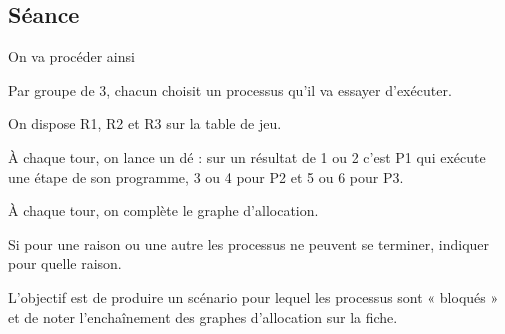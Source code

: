 \documentclass[12pt,a4paper,article,english,firamath]{nsi}
\begin{document}
\subsection*{Séance}

On va procéder ainsi

\begin{enumalph}
	\item Par groupe de 3, chacun choisit un processus qu'il va essayer d'exécuter.
	\item On dispose R1, R2 et R3 sur la table de jeu.
	\item À chaque tour, on lance un dé : sur un résultat de 1 ou 2 c'est P1 qui exécute une étape de son programme, 3 ou 4 pour P2 et 5 ou 6 pour P3.\\
	\item À chaque tour, on complète le graphe d'allocation.
	\item  Si pour une raison ou une autre les processus ne peuvent se terminer, indiquer pour quelle raison.
\end{enumalph}

L'objectif est de produire un scénario pour lequel les processus sont « bloqués » et de noter l'enchaînement des graphes d'allocation sur la fiche.
\end{document}
